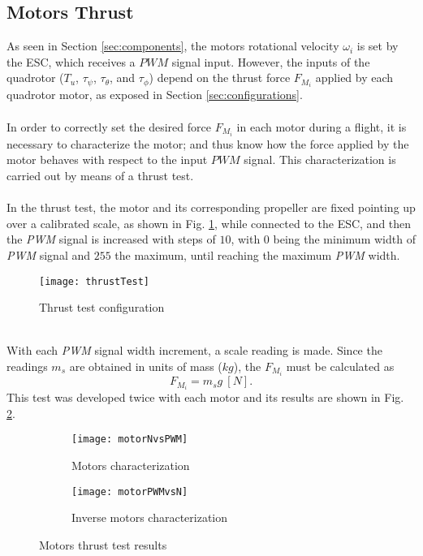 \subsection{Motors Thrust}
As seen in Section \ref{sec:components}, the motors rotational velocity $\omega_{i}$ is set by the ESC, which receives a $PWM$ signal input. However, the inputs of the quadrotor ($T_u$, $\tau_\psi$, $\tau_\theta$, and $\tau_\phi$) depend on the thrust force $F_{M_{i}}$ applied by each quadrotor motor, as exposed in Section \ref{sec:configurations}.
\\\\
In order to correctly set the desired force $F_{M_{i}}$ in each motor during a flight, it is necessary to characterize the motor; and thus know how the force applied by the motor behaves with respect to the input $PWM$ signal. This characterization is carried out by means of a thrust test.
\\\\
In the thrust test, the motor and its corresponding propeller are fixed pointing up over a calibrated scale, as shown in Fig. \ref{fig:thrusttest}, while connected to the ESC, and then the \textit{PWM} signal is increased with steps of $10$, with $0$ being the minimum width of \textit{PWM} signal and $255$ the maximum, until reaching the maximum \textit{PWM} width. 
\begin{figure}[h]
	\begin{center}
		\texttt{[image: thrustTest]}    
		\caption{Thrust test configuration} 
		\label{fig:thrusttest}
	\end{center}
\end{figure}
\\With each  \textit{PWM} signal width increment, a scale reading is made. Since the readings $m_{s}$ are obtained in units of mass ($kg$), the $F_{M_i}$ must be calculated as
\begin{equation}
F_{M_i} = m_{s}g\ [N].
\end{equation}
This test was developed twice with each motor and its results are shown in Fig. \ref{fig:motor}.
\begin{figure}[H]
\begin{subfigure}{.5\linewidth}
\centering
\texttt{[image: motorNvsPWM]}
\caption{Motors characterization}
\label{fig:motor}
\end{subfigure}%
\begin{subfigure}{.5\linewidth}
\centering
\texttt{[image: motorPWMvsN]}
\caption{Inverse motors characterization}
\label{fig:inversemotor}
\end{subfigure}
\caption{Motors thrust test results}
\label{fig:test}
\end{figure}
